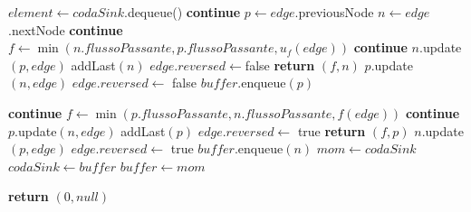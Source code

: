 \documentclass{article}
\begin{document}
\begin{algorithm}
    \begin{algorithmic}
        \STATE $element \leftarrow codaSink.$dequeue()
        \STATE \textbf{continue}
        \ENDIF
        \STATE $p \leftarrow edge.$previousNode
        \STATE $n \leftarrow edge$.nextNode
        \STATE \textbf{continue}
        \ELSE
        \STATE $f \leftarrow \min (n.flussoPassante,p.flussoPassante,u_f(edge))$
        \STATE \textbf{continue}
        \ENDIF
        \STATE $n$.update$(p,edge)$
        \STATE addLast$(n)$
        \STATE $edge.reversed \leftarrow $false
        \STATE \textbf{return} $(f,n)$
        \ENDIF
        \ENDIF
        \STATE $p.$update$(n,edge)$
        \STATE $edge.reversed \leftarrow$ false
        \STATE $buffer.$enqueue$(p)$
    \end{algorithmic}
\end{algorithm}
\newpage
\begin{algorithm}
    \begin{algorithmic}
        \STATE \textbf{continue}
        \ELSE
        \STATE $f \leftarrow \min(p.flussoPassante,n.flussoPassante,f(edge))$
        \STATE \textbf{continue}
        \ENDIF
        \STATE $p.$update$(n,edge)$
        \STATE addLast$(p)$
        \STATE $edge.reversed \leftarrow$ true
        \STATE \textbf{return } $(f,p)$
        \ENDIF
        \ENDIF
        \STATE $n.$update$(p,edge)$
        \STATE $edge.reversed \leftarrow$ true
        \STATE $buffer.$enqueue$(n)$
        \ENDIF
        \ENDFOR
        \ENDWHILE
        \STATE $mom \leftarrow codaSink$
        \STATE $codaSink \leftarrow buffer$
        \STATE $buffer \leftarrow mom$

        \ENDWHILE
        \STATE \textbf{return} $(0,null)$
    \end{algorithmic}
\end{algorithm}
\end{document}
